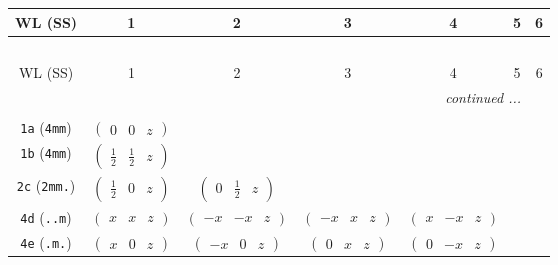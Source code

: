 \documentclass[fleqn,9pt,landscape]{jsarticle}
\begin{document}
\begin{center}
\renewcommand{\arraystretch}{1.2}
\begin{longtable}{ccccccc}
 \hline \hline
WL (SS) & 1 & 2 & 3 & 4 & 5 & 6 \\ \hline \endfirsthead

\multicolumn{6}{l}{\tablename\ \thetable{}} \\
 \hline \hline
WL (SS) & 1 & 2 & 3 & 4 & 5 & 6 \\ \hline \endhead

 \hline \hline
\multicolumn{6}{r}{\footnotesize\it continued ...} \\ \endfoot

 \hline \hline
\multicolumn{6}{r}{} \\ \endlastfoot

{\tt 1a} ({\tt 4mm}) & $ \begin{pmatrix} 0 & 0 & z \end{pmatrix} $ & $  $ & $  $ & $  $ & $  $ & $  $ \\ \hline
{\tt 1b} ({\tt 4mm}) & $ \begin{pmatrix} \frac{1}{2} & \frac{1}{2} & z \end{pmatrix} $ & $  $ & $  $ & $  $ & $  $ & $  $ \\ \hline
{\tt 2c} ({\tt 2mm.}) & $ \begin{pmatrix} \frac{1}{2} & 0 & z \end{pmatrix} $ & $ \begin{pmatrix} 0 & \frac{1}{2} & z \end{pmatrix} $ & $  $ & $  $ & $  $ & $  $ \\ \hline
{\tt 4d} ({\tt ..m}) & $ \begin{pmatrix} x & x & z \end{pmatrix} $ & $ \begin{pmatrix} - x & - x & z \end{pmatrix} $ & $ \begin{pmatrix} - x & x & z \end{pmatrix} $ & $ \begin{pmatrix} x & - x & z \end{pmatrix} $ & $  $ & $  $ \\ \hline
{\tt 4e} ({\tt .m.}) & $ \begin{pmatrix} x & 0 & z \end{pmatrix} $ & $ \begin{pmatrix} - x & 0 & z \end{pmatrix} $ & $ \begin{pmatrix} 0 & x & z \end{pmatrix} $ & $ \begin{pmatrix} 0 & - x & z \end{pmatrix} $ & $  $ & $  $ \\ \hline

\end{longtable}
\end{center}
\end{document}
